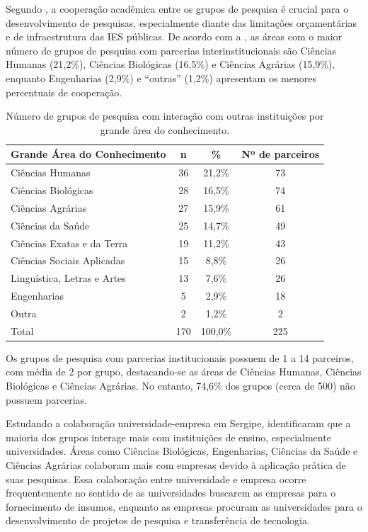 \documentclass[portuguese]{textolivre}
\begin{document}
Segundo \textcite{florencio2018}, a cooperação acadêmica entre os grupos de pesquisa é crucial para o desenvolvimento de pesquisas, especialmente diante das limitações orçamentárias e de infraestrutura das IES públicas. De acordo com a , as áreas com o maior número de grupos de pesquisa com parcerias interinstitucionais são Ciências Humanas (21,2\%), Ciências Biológicas (16,5\%) e Ciências Agrárias (15,9\%), enquanto Engenharias (2,9\%) e “outras” (1,2\%) apresentam os menores percentuais de cooperação.

\begin{table}[htbp]
\centering
\begin{threeparttable}
\caption{Número de grupos de pesquisa com interação com outras instituições por grande área do conhecimento.}
\label{tbl3}
\begin{tabular}{lccc}
\toprule
Grande Área do Conhecimento & n & \% & Nº de parceiros\\ 
 \midrule
Ciências Humanas & 36 & 21,2\% & 73 \\
Ciências Biológicas & 28 & 16,5\% & 74 \\
Ciências Agrárias & 27 & 15,9\% & 61 \\
Ciências da Saúde & 25 & 14,7\% & 49 \\
Ciências Exatas e da Terra & 19 & 11,2\% & 43 \\
Ciências Sociais Aplicadas & 15 & 8,8\% & 26 \\
Linguística, Letras e Artes & 13 & 7,6\% & 26 \\
Engenharias & 5 & 2,9\% & 18 \\
Outra & 2 & 1,2\% & 2 \\
\midrule
Total & 170 & 100,0\% & 225 \\
\bottomrule
\end{tabular}
\end{threeparttable}
\end{table}

Os grupos de pesquisa com parcerias institucionais possuem de 1 a 14 parceiros, com média de 2 por grupo, destacando-se as áreas de Ciências Humanas, Ciências Biológicas e Ciências Agrárias. No entanto, 74,6\% dos grupos (cerca de 500) não possuem parcerias.

Estudando a colaboração universidade-empresa em Sergipe, \textcite{florencio2018} identificaram que a maioria dos grupos interage mais com instituições de ensino, especialmente universidades. Áreas como Ciências Biológicas, Engenharias, Ciências da Saúde e Ciências Agrárias colaboram mais com empresas devido à aplicação prática de suas pesquisas. Essa colaboração entre universidade e empresa ocorre frequentemente no sentido de as universidades buscarem as empresas para o fornecimento de insumos, enquanto as empresas procuram as universidades para o desenvolvimento de projetos de pesquisa e transferência de tecnologia.
\end{document}
